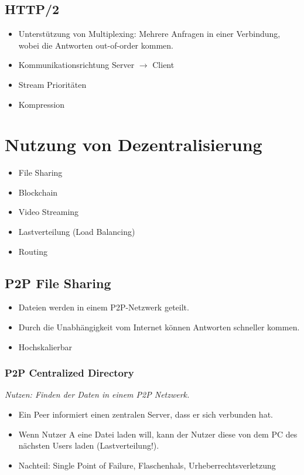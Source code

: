         \subsection{HTTP/2} %
			\begin{itemize}
				\item Unterstützung von Multiplexing: Mehrere Anfragen in einer Verbindung, wobei die Antworten out-of-order kommen.
				\item Kommunikationsrichtung Server \(\rightarrow\) Client
				\item Stream Prioritäten
				\item Kompression
			\end{itemize}

    \section{Nutzung von Dezentralisierung}
        \begin{itemize}
        	\item File Sharing
        	\item Blockchain
        	\item Video Streaming
        	\item Lastverteilung (Load Balancing)
        	\item Routing
        \end{itemize}

        \subsection{P2P File Sharing}
            \begin{itemize}
            	\item Dateien werden in einem P2P-Netzwerk geteilt.
            	\item Durch die Unabhängigkeit vom Internet können Antworten schneller kommen.
            	\item Hochskalierbar
            \end{itemize}
            
            \subsubsection{P2P Centralized Directory}
                \textit{Nutzen: Finden der Daten in einem P2P Netzwerk.}
            
                \begin{itemize}
                	\item Ein Peer informiert einen zentralen Server, dass er sich verbunden hat.
                	\item Wenn Nutzer A eine Datei laden will, kann der Nutzer diese von dem PC des nächsten Users laden (Lastverteilung!).
                	\item Nachteil: Single Point of Failure, Flaschenhals, Urheberrechtsverletzung
                \end{itemize}
            
